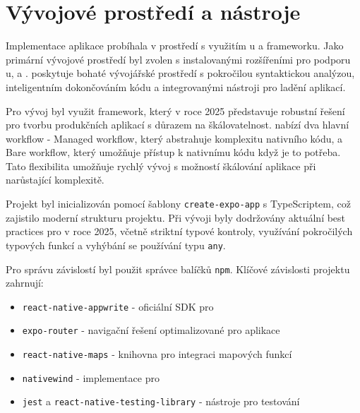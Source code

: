 \documentclass[czech, bp, kiv, he, iso690numb, pdf]{fasthesis}
\begin{document}
    \section{Vývojové prostředí a nástroje}

    Implementace aplikace probíhala v prostředí  s využitím u a  frameworku. Jako primární vývojové prostředí byl zvolen  s instalovanými rozšířeními pro podporu u,  a .  poskytuje bohaté vývojářské prostředí s pokročilou syntaktickou analýzou, inteligentním dokončováním kódu a integrovanými nástroji pro ladění  aplikací.

    Pro vývoj byl využit  framework, který v roce 2025 představuje robustní řešení pro tvorbu produkčních  aplikací s důrazem na škálovatelnost.  nabízí dva hlavní workflow - Managed workflow, který abstrahuje komplexitu nativního kódu, a Bare workflow, který umožňuje přístup k nativnímu kódu když je to potřeba. Tato flexibilita umožňuje rychlý vývoj s možností škálování aplikace při narůstající komplexitě.

    Projekt byl inicializován pomocí šablony \texttt{create-expo-app} s TypeScriptem, což zajistilo moderní strukturu projektu. Při vývoji byly dodržovány aktuální best practices pro  v roce 2025, včetně striktní typové kontroly, využívání pokročilých typových funkcí a vyhýbání se používání typu \texttt{any}.

    Pro správu závislostí byl použit správce balíčků \texttt{npm}. Klíčové závislosti projektu zahrnují:

    \begin{itemize}
        \item \texttt{react-native-appwrite} - oficiální SDK  pro 
        \item \texttt{expo-router} - navigační řešení optimalizované pro  aplikace
        \item \texttt{react-native-maps} - knihovna pro integraci mapových funkcí
        \item \texttt{nativewind} - implementace  pro 
        \item \texttt{jest} a \texttt{react-native-testing-library} - nástroje pro testování
    \end{itemize}
\end{document}
